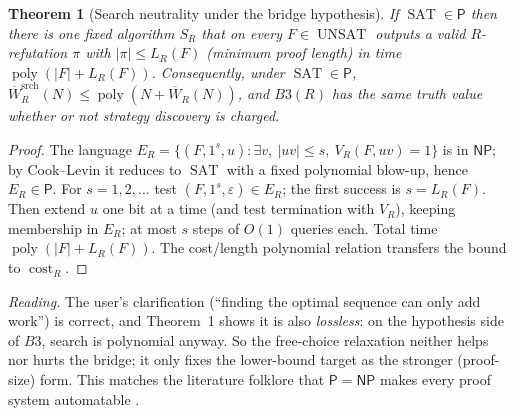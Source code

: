\documentclass[11pt]{article}
\newtheorem{theorem}{Theorem}
\newcommand{\SAT}{\operatorname{SAT}}
\newcommand{\UNSAT}{\operatorname{UNSAT}}
\newcommand{\poly}{\operatorname{poly}}
\newcommand{\Wb}{\overline W}
\begin{document}
\begin{theorem}[Search neutrality under the bridge hypothesis]
If $\SAT\in\mathsf P$ then there is one fixed algorithm $S_R$ that on every
$F\in\UNSAT$ outputs a valid $R$-refutation $\pi$ with
$|\pi|\le L_R(F)$ (minimum proof length) in time $\poly(|F|+L_R(F))$.
Consequently, under $\SAT\in\mathsf P$,
$\Wb^{\mathrm{srch}}_R(N)\le\poly(N+\Wb_R(N))$, and $B3(R)$ has the same
truth value whether or not strategy discovery is charged.
\end{theorem}
\begin{proof}
The language
$E_R=\{(F,1^s,u):\exists v,\ |uv|\le s,\ V_R(F,uv)=1\}$ is in $\mathsf{NP}$;
by Cook--Levin it reduces to $\SAT$ with a fixed polynomial blow-up, hence
$E_R\in\mathsf P$. For $s=1,2,\dots$ test $(F,1^s,\varepsilon)\in E_R$; the
first success is $s=L_R(F)$. Then extend $u$ one bit at a time (and test
termination with $V_R$), keeping membership in $E_R$; at most
$s$ steps of $O(1)$ queries each. Total time
$\poly(|F|+L_R(F))$. The cost/length polynomial relation transfers the
bound to $\operatorname{cost}_R$.
\end{proof}
\noindent\emph{Reading.} The user's clarification (``finding the optimal
sequence can only add work'') is correct, and Theorem~1 shows it is also
\emph{lossless}: on the hypothesis side of $B3$, search is polynomial
anyway. So the free-choice relaxation neither helps nor hurts the bridge;
it only fixes the lower-bound target as the stronger (proof-size) form.
This matches the literature folklore that $\mathsf P=\mathsf{NP}$ makes
every proof system automatable \cite{atserias}.
\end{document}
